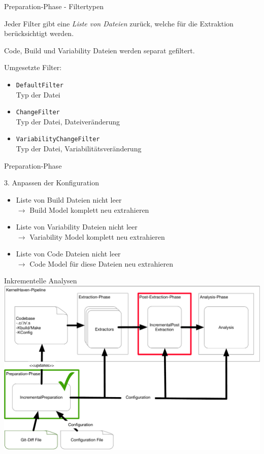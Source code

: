 \documentclass[aspectratio=43, noserifmath]{beamer}
\begin{document}
\begin{frame}{Preparation-Phase - Filtertypen}

Jeder Filter gibt eine \emph{Liste von Dateien} zur\"uck, welche f\"ur die Extraktion ber\"ucksichtigt werden.

Code, Build und Variability Dateien werden separat gefiltert.

Umgesetzte Filter:

\begin{itemize}
    \item[\textbullet] \texttt{DefaultFilter}\\Typ der Datei
    \pause
    \item[\textbullet] \texttt{ChangeFilter}\\Typ der Datei, Dateiver\"anderung
    \pause
    \item[\textbullet] \texttt{VariabilityChangeFilter}\\Typ der Datei, Variabilit\"atsver\"anderung
\end{itemize}

\end{frame}

\begin{frame}{Preparation-Phase}

3. Anpassen der Konfiguration \\

\begin{itemize}
    \item[\textbullet] Liste von Build Dateien nicht leer \\ $\rightarrow$ Build Model \alert{komplett} neu extrahieren
    \pause
    \item[\textbullet] Liste von Variability Dateien nicht leer \\ $\rightarrow$ Variability Model \alert{komplett} neu extrahieren
    \pause
    \item[\textbullet] Liste von Code Dateien nicht leer \\ $\rightarrow$ Code Model \alert{f\"ur diese Dateien} neu extrahieren
\end{itemize}
\end{frame}


\begin{frame}[containsverbatim]{Inkrementelle Analysen}
\includegraphics[width=1\textwidth]{image/KernelHavenIncremental-2.pdf}
\end{frame}
\end{document}

